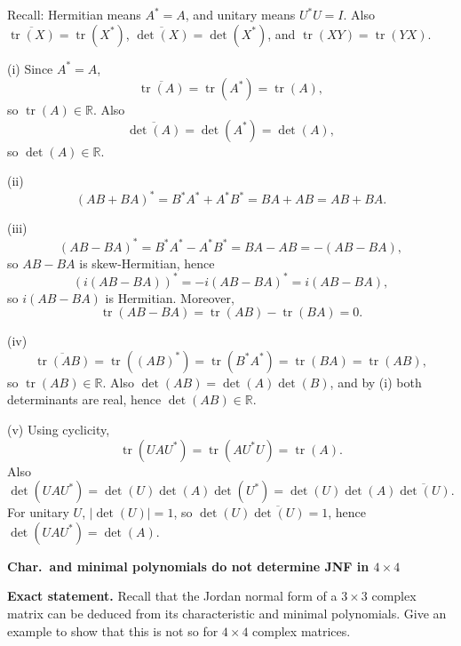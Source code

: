 \begin{solution}
Recall: Hermitian means \(A^\ast=A\), and unitary means \(U^\ast U=I\). Also
\(\overline{\operatorname{tr}(X)}=\operatorname{tr}(X^\ast)\),
\(\overline{\det(X)}=\det(X^\ast)\),
and \(\operatorname{tr}(XY)=\operatorname{tr}(YX)\).

	\par\noindent (i)\quad
	Since \(A^\ast=A\),
	\[
	\overline{\operatorname{tr}(A)}=\operatorname{tr}(A^\ast)=\operatorname{tr}(A),
	\]
	so \(\operatorname{tr}(A)\in\mathbb R\). Also
	\[
	\overline{\det(A)}=\det(A^\ast)=\det(A),
	\]
	so \(\det(A)\in\mathbb R\).

	\par\noindent (ii)\quad
	\[
	(AB+BA)^\ast=B^\ast A^\ast + A^\ast B^\ast=BA+AB=AB+BA.
	\]

	\par\noindent (iii)\quad
	\[
	(AB-BA)^\ast=B^\ast A^\ast-A^\ast B^\ast=BA-AB=-(AB-BA),
	\]
	so \(AB-BA\) is skew-Hermitian, hence
	\[
	(i(AB-BA))^\ast=-i(AB-BA)^\ast=i(AB-BA),
	\]
	so \(i(AB-BA)\) is Hermitian. Moreover,
	\[
	\operatorname{tr}(AB-BA)=\operatorname{tr}(AB)-\operatorname{tr}(BA)=0.
	\]

	\par\noindent (iv)\quad
	\[
	\overline{\operatorname{tr}(AB)}=\operatorname{tr}((AB)^\ast)=\operatorname{tr}(B^\ast A^\ast)=\operatorname{tr}(BA)=\operatorname{tr}(AB),
	\]
	so \(\operatorname{tr}(AB)\in\mathbb R\). Also \(\det(AB)=\det(A)\det(B)\), and by (i) both determinants are real, hence \(\det(AB)\in\mathbb R\).

	\par\noindent (v)\quad
	Using cyclicity,
	\[
	\operatorname{tr}(UAU^\ast)=\operatorname{tr}(AU^\ast U)=\operatorname{tr}(A).
	\]
	Also
	\[
	\det(UAU^\ast)=\det(U)\det(A)\det(U^\ast)=\det(U)\det(A)\overline{\det(U)}.
	\]
	For unitary \(U\), \(|\det(U)|=1\), so \(\det(U)\overline{\det(U)}=1\), hence \(\det(UAU^\ast)=\det(A)\).
\end{solution}

\begin{problem}[CP-I-0095]
\label{prob:cp-i-0095}
\textbf{Char.\ and minimal polynomials do not determine JNF in $4\times 4$}

\textbf{Exact statement.}
\hspace*{1.5em}Recall that the Jordan normal form of a $3\times 3$ complex matrix can be deduced from its characteristic and minimal polynomials.
Give an example to show that this is not so for $4\times 4$ complex matrices.

\end{problem}

